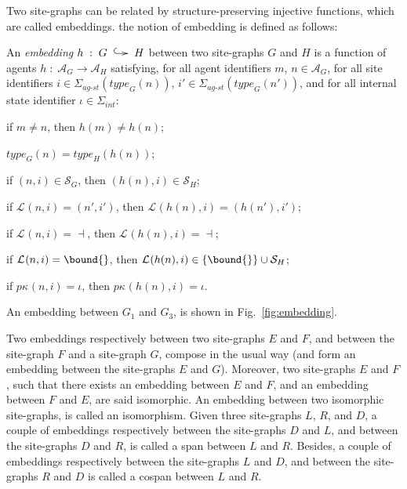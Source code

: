 \documentclass[10pt,a4paper]{llncs}
\makeatletter
\newcommand{\statename}{\signaturesymb_{\textit{int}}}
\newcommand{\bothsite}{\signaturesymb_{\textit{ag-st}}}
\newcommand{\signaturesymb}{\Sigma}
\newcommand{\graphsymb}{G}
\newcommand{\agents}[1][]{\mathcal{A}_{#1}}
\newcommand{\type}[1][]{\textit{type}_{#1}}
\newcommand{\sites}[1][]{\mathcal{S}_{#1}}
\newcommand{\links}[1][]{\mathcal{L}_{#1}}
\newcommand{\props}[1][]{p\kappa_{#1}}
\newcommand{\free}{\dashv}
\newcommand{\rembedding}[1][]{\xymatrix@C=0.35cm{{}\ar@{^{(}->}[r]^{#1}&{}}}
\makeatother
\begin{document}

Two site-graphs can be related by structure-preserving injective functions, which are called embeddings. the notion of embedding is defined as follows:
\begin{definition}%
 An \emph{embedding} $h\;:\;G\;\rembedding H$ between two site-graphs $G$ and $H$ is a function of agents $h\;:\;\agents[G]\rightarrow \agents[H]$ satisfying,
for all agent identifiers $m$, $n\in\agents[G]$, for all site identifiers $i\in\bothsite(\type[G](n))$, $i'\in\bothsite(\type[G](n'))$,
and for all internal state identifier $\iota\in\statename$: \begin{inparaenum}
\item if $m\neq n$,  then $h(m)\neq h(n)$;
\item $\type[G](n) = \type[H](h(n))$;
\item if $(n,i)\in\sites[G]$, then $(h(n), i)\in\sites[H]$;
\item if $\links(n,i)=(n',i')$, then $\links(h(n),i)=(h(n'),i')$;
\item if $\links(n,i)=\free$, then $\links(h(n),i)=\free$;
\item if $\links(n,i)=\bound{}$, then $\links(h(n),i)\in\{\bound{}\}\cup\sites[H]$;
\item if $\props(n,i)=\iota$, then $\props(h(n),i)=\iota$.
\end{inparaenum}
\end{definition}

\begin{example}%
An embedding between
$\graphsymb_1$ and $\graphsymb_3$, is shown in Fig.~\ref{fig:embedding}.
\end{example}



Two embeddings respectively between two site-graphs $E$ and $F$, and between the site-graph $F$ and a site-graph $G$, compose in the usual way (and form an embedding between the site-graphs $E$ and $G$). Moreover, two site-graphs $E$ and $F$, such that there exists an embedding between $E$ and $F$, and an embedding between $F$ and $E$, are said isomorphic. An embedding between two isomorphic site-graphs, is called an isomorphism.
Given three site-graphs $L$, $R$, and $D$, a couple of embeddings respectively between the site-graphs $D$ and $L$, and between the site-graphs $D$ and $R$, is called a span %
between %
$L$ and $R$. Besides, a couple of embeddings respectively between the site-graphs $L$ and $D$, and between the site-graphs $R$ and $D$
is called a cospan %
between %
$L$ and $R$.
\end{document}

